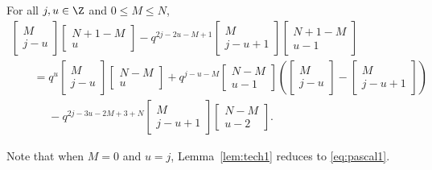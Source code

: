 \begin{Lemma}
\label{lem:tech1}
For all $j,u \in \Z$ and $0\leq M\leq N$,
\begin{gather*}
\begin{bmatrix}
M\\
j-u
\end{bmatrix} \begin{bmatrix}
N+1-M\\
u
\end{bmatrix}-q^{2j-2u-M+1}\begin{bmatrix}
M\\
j-u+1
\end{bmatrix} \begin{bmatrix}
N+1-M\\
u-1
\end{bmatrix}\\
\qquad=q^{u}\begin{bmatrix}
M\\
j-u
\end{bmatrix} \begin{bmatrix}
N-M\\
u
\end{bmatrix}
+q^{j-u-M}\begin{bmatrix}
N-M\\
u-1
\end{bmatrix}\left(\begin{bmatrix}
M\\
j-u
\end{bmatrix}-\begin{bmatrix}
M\\
j-u+1
\end{bmatrix}\right)\\
\phantom{\qquad=}{} -q^{2j-3u-2M+3+N}\begin{bmatrix}
M\\
j-u+1
\end{bmatrix} \begin{bmatrix}
N-M\\
u-2
\end{bmatrix} .
\end{gather*}
\end{Lemma}

Note that when $M=0$ and $u=j$, Lemma~\ref{lem:tech1} reduces to \eqref{eq:pascal1}.

